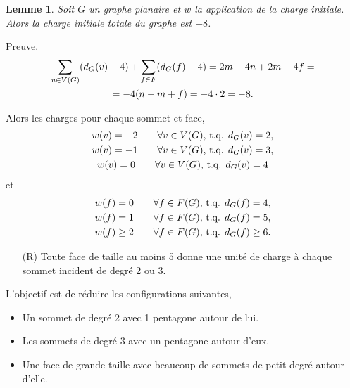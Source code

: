 \documentclass{beamer}
\newtheorem{lemme}{Lemme}
\begin{document}
\begin{frame}
\begin{lemme}
Soit $G$ un graphe planaire et $w$ la application de la charge initiale. Alors la charge initiale totale du graphe est $-8$.
\end{lemme}

Preuve.
$$
\gathered
\sum_{u \in V(G)} (d_G(v) - 4) + \sum_{f \in F} (d_G(f) - 4) = 2m - 4n + 2m - 4f =\\
= -4( n - m + f) = -4 \cdot 2 = -8.
\endgathered
$$
\end{frame}

\begin{frame}
Alors les charges pour chaque sommet et face,
$$
\gathered
w(v) = -2 \qquad \forall v \in V(G) \textrm{,  t.q.  } d_G(v) = 2,\\
w(v) = -1 \qquad \forall v \in V(G) \textrm{,  t.q.  } d_G(v) = 3,\\
w(v) = 0 \qquad \forall  v \in V(G) \textrm{,  t.q.  } d_G(v) = 4
\endgathered
$$
et
$$
\gathered
w(f) = 0 \qquad \forall f \in F(G) \textrm{,  t.q.  } d_G(f) = 4,\\
w(f) = 1 \qquad \forall f \in F(G) \textrm{,  t.q.  } d_G(f) = 5,\\
w(f) \geq 2 \qquad \forall f \in F(G) \textrm{, t.q.  } d_G(f) \geq 6.
\endgathered
$$
\end{frame}

\begin{frame}


\begin{enumerate}
\item [(R)] Toute face de taille au moins 5 donne une unité de charge à chaque sommet incident de degré 2 ou 3.
\end{enumerate}
%
\pause


L'objectif est de réduire les configurations suivantes,
\begin{itemize}
\item Un sommet de degré 2 avec 1 pentagone autour de lui.
\item Les sommets de degré 3 avec un pentagone autour d'eux.
\item Une face de grande taille avec beaucoup de sommets de petit degré autour d'elle.
\end{itemize}
\end{frame}
\end{document}

